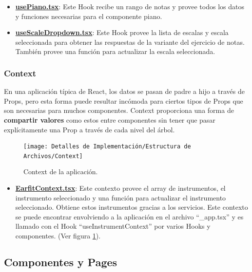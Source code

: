 \documentclass[12pt,twoside,titlepage]{report}
\begin{document}
\begin{itemize}
    \item \href{https://github.com/alberttogoca/EarFit/blob/main/src/hooks/usePiano.tsx}{\textbf{usePiano.tsx}}: Este Hook recibe un rango de notas y provee todos los datos y funciones necesarias para el componente piano.
    \item \href{https://github.com/alberttogoca/EarFit/blob/main/src/hooks/useScaleDropdown.tsx}{\textbf{useScaleDropdown.tsx}}: Este Hook provee la lista de escalas y escala seleccionada para obtener las respuestas de la variante del ejercicio de notas. También provee una función para actualizar la escala seleccionada.
\end{itemize}

\subsubsection{Context}

En una aplicación típica de React, los datos se pasan de padre a hijo a través de Props, pero esta forma puede resultar incómoda para ciertos tipos de Props que son necesarias para muchos componentes. Context proporciona una forma de \textbf{compartir valores} como estos entre componentes sin tener que pasar explícitamente una Prop a través de cada nivel del árbol.
\cite{context1}

\begin{figure}[H]
    \centering
    \texttt{[image: Detalles de Implementación/Estructura de Archivos/Context]}
    \caption{Context de la aplicación.}
    \label{fig:Context}
\end{figure}

\begin{itemize}
    \item \href{https://github.com/alberttogoca/EarFit/blob/main/src/context/EarfitContext.tsx}{\textbf{EarfitContext.tsx}}: Este contexto provee el array de instrumentos, el instrumento seleccionado y una función para actualizar el instrumento seleccionado. Obtiene estos instrumentos gracias a los servicios.    
    Este contexto se puede encontrar envolviendo a la aplicación en el archivo ``\_app.tsx'' y es llamado con el Hook ``useInstrumentContext'' por varios Hooks y componentes.
    (Ver figura \ref{fig:Context}).       
\end{itemize}

\subsection{Componentes y Pages}
\label{sec:componentes}
\end{document}
